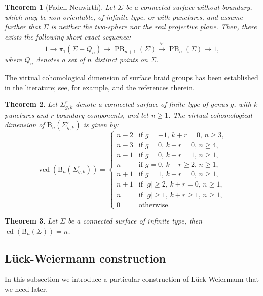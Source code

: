 \documentclass[a4paper,12pt,leqno]{amsart}
\newtheorem{theorem}{Theorem}[section]
\theoremstyle{definition}
\DeclareMathOperator{\cd}{cd}
\DeclareMathOperator{\vcd}{vcd}
\DeclareMathOperator{\pb}{PB}
\begin{document}
\begin{theorem}[Fadell-Neuwirth]
\label{Fadell:Neuwirth}
Let \(\Sigma\) be a connected surface without boundary, which may be non-orientable, of infinite type, or with punctures, and assume further that \(\Sigma\) is neither the two-sphere nor the real projective plane. Then, there exists the following short exact sequence:
\[
1 \to \pi_1(\Sigma - Q_n) \to \pb_{n+1}(\Sigma) \xrightarrow{\varphi} \pb_n(\Sigma) \to 1,
\]
where \( Q_n \) denotes a set of \( n \) distinct points on \( \Sigma \).
\end{theorem}
The virtual cohomological dimension of surface braid groups has been established in the literature; see, for example, \cite[Theorem 1.1]{2025arXiv250610706L} and the references therein.
\begin{theorem}\label{vcd:surfaces:braid:groups:0}
Let $\Sigma_{g,k}^r$ denote a connected surface of finite type of genus $g$, with $k$ punctures and $r$ boundary components, and let $n \geq 1$. The virtual cohomological dimension of \( \mathrm{B}_n(\Sigma_{g,k}^r) \) is given by:
\[
\vcd(\mathrm{B}_n(\Sigma_{g,k}^r)) = 
\begin{cases}
    n - 2 & \text{if } g = -1, \, k + r = 0, \, n \geq 3, \\
    n - 3 & \text{if } g = 0, \, k + r = 0, \, n \geq 4, \\
    n - 1 & \text{if } g = 0, \, k + r = 1, \, n \geq 1, \\
    n & \text{if } g = 0, \, k + r \geq 2, \, n \geq 1, \\
    n + 1 & \text{if } g = 1, \, k + r = 0, \, n \geq 1, \\
    n + 1 & \text{if } \lvert g \rvert \geq 2, \, k + r = 0, \, n \geq 1, \\
    n & \text{if } \lvert g \rvert \geq 1, \, k + r \geq 1, \, n \geq 1, \\
    0 & \text{otherwise}.
\end{cases}
\]
\end{theorem}

\begin{theorem}\cite[Corollary 4.4]{2025arXiv250610706L}\label{dc:infi:braid}
Let $\Sigma$ be a  connected surface of infinite type, then $\cd(\mathrm{B}_n(\Sigma))=n$.
\end{theorem}

\subsection{Lück-Weiermann  construction}
In this subsection we introduce a particular construction of Lück-Weiermann \cite[Theorem 2.3]{LW12} that we need later.
\end{document}
